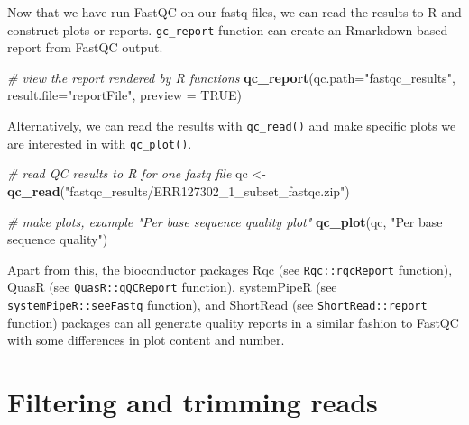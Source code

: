 \documentclass[12pt,]{krantz}
\newenvironment{Shaded}{\begin{snugshade}}{\end{snugshade}}
\newcommand{\CommentTok}[1]{\textcolor[rgb]{0.56,0.35,0.01}{\textit{#1}}}
\newcommand{\DataTypeTok}[1]{\textcolor[rgb]{0.13,0.29,0.53}{#1}}
\newcommand{\KeywordTok}[1]{\textcolor[rgb]{0.13,0.29,0.53}{\textbf{#1}}}
\newcommand{\NormalTok}[1]{#1}
\newcommand{\OtherTok}[1]{\textcolor[rgb]{0.56,0.35,0.01}{#1}}
\newcommand{\StringTok}[1]{\textcolor[rgb]{0.31,0.60,0.02}{#1}}
\begin{document}
Now that we have run FastQC on our fastq files, we can read the results to R and construct plots or reports. \texttt{gc\_report} function can create an Rmarkdown based report from FastQC output.

\begin{Shaded}
\begin{Highlighting}[]
\CommentTok{# view the report rendered by R functions}
\KeywordTok{qc_report}\NormalTok{(}\DataTypeTok{qc.path=}\StringTok{"fastqc_results"}\NormalTok{, }
          \DataTypeTok{result.file=}\StringTok{"reportFile"}\NormalTok{, }\DataTypeTok{preview =} \OtherTok{TRUE}\NormalTok{)}
\end{Highlighting}
\end{Shaded}

Alternatively, we can read the results with \texttt{qc\_read()} and make specific plots we are interested in with \texttt{qc\_plot()}.

\begin{Shaded}
\begin{Highlighting}[]
\CommentTok{# read QC results to R for one fastq file}
\NormalTok{qc <-}\StringTok{ }\KeywordTok{qc_read}\NormalTok{(}\StringTok{"fastqc_results/ERR127302_1_subset_fastqc.zip"}\NormalTok{)}

\CommentTok{# make plots, example "Per base sequence quality plot"}
\KeywordTok{qc_plot}\NormalTok{(qc, }\StringTok{"Per base sequence quality"}\NormalTok{)}
\end{Highlighting}
\end{Shaded}

Apart from this, the bioconductor packages Rqc \citep{Rqc} (see \texttt{Rqc::rqcReport} function), QuasR \citep{gaidatzis_quasr:_2015} (see \texttt{QuasR::qQCReport} function), systemPipeR \citep{backman_systempiper:_2016} (see \texttt{systemPipeR::seeFastq} function), and ShortRead \citep{morgan_shortread:_2009} (see \texttt{ShortRead::report} function) packages can all generate quality reports in a similar fashion to FastQC with some differences in plot content and number.

\hypertarget{filtering-and-trimming-reads}{%
\section{Filtering and trimming reads}\label{filtering-and-trimming-reads}}
\end{document}
